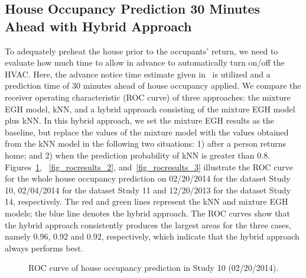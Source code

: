 \subsection{House Occupancy Prediction 30 Minutes Ahead with Hybrid Approach}
To adequately preheat the house prior to the occupants' return, 
we need to evaluate how much time to allow in advance to automatically turn on/off the HVAC. 
Here, the advance notice time estimate given in~\cite{scott2011preheat} is utilized 
and a prediction time of 30 minutes ahead of house occupancy applied. 
We compare the receiver operating characteristic (ROC curve) of three approaches: 
the mixture EGH model,  kNN, and a hybrid approach consisting of the mixture EGH model plus kNN. 
In this hybrid approach, 
we set the mixture EGH results as the baseline, 
but replace the values of the mixture model with the values obtained from the kNN model 
in the following two situations: 
1) after a person returns home; and 2) when the prediction probability of kNN is greater than 0.8. 
Figures~\ref{fig_rocresults_1}, ~\ref{fig_rocresults_2}, and~\ref{fig_rocresults_3} illustrate the ROC curve for the whole house occupancy prediction on 02/20/2014 for the dataset Study 10, 02/04/2014 for the dataset Study 11 
and 12/20/2013 for the dataset Study 14, respectively.  
The red and green lines represent the kNN and mixture EGH models; 
the blue line denotes the hybrid approach. 
The ROC curves show that the hybrid approach consistently produces the largest areas for the three cases, 
namely 
0.96, 0.92 and 0.92, respectively, 
which indicate that the hybrid approach always performs best. 
%
\begin{figure}[h]
	\caption{
	ROC curve of house occupancy prediction in Study 10 (02/20/2014).}
	\label{fig_rocresults_1}
\end{figure}

